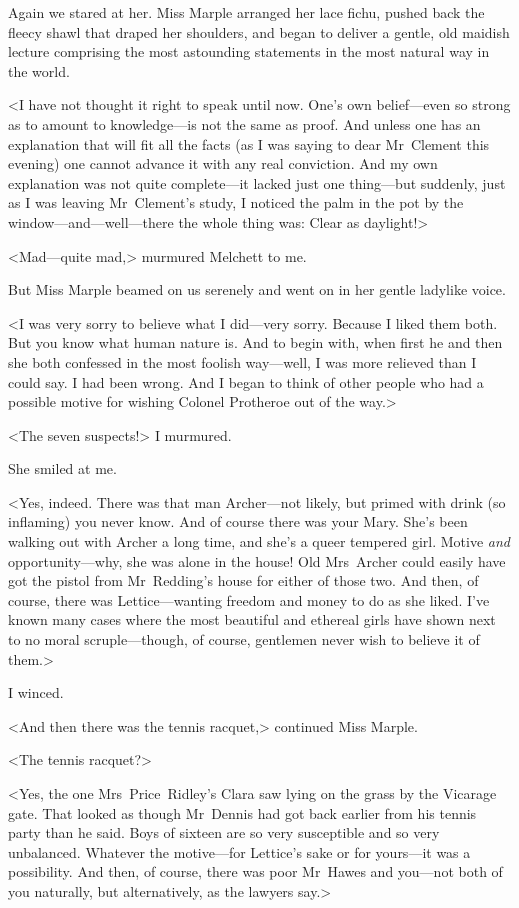 Again we stared at her. Miss Marple arranged her lace fichu, pushed back the fleecy shawl that draped her shoulders, and began to deliver a gentle, old maidish lecture comprising the most astounding statements in the most natural way in the world.

<I have not thought it right to speak until now. One's own belief—even so strong as to amount to knowledge—is not the same as proof. And unless one has an explanation that will fit all the facts (as I was saying to dear Mr~Clement this evening) one cannot advance it with any real conviction. And my own explanation was not quite complete—it lacked just one thing—but suddenly, just as I was leaving Mr~Clement's study, I noticed the palm in the pot by the window—and—well—there the whole thing was: Clear as daylight!>

<Mad—quite mad,> murmured Melchett to me.

But Miss Marple beamed on us serenely and went on in her gentle ladylike voice.

<I was very sorry to believe what I did—very sorry. Because I liked them both. But you know what human nature is. And to begin with, when first he and then she both confessed in the most foolish way—well, I was more relieved than I could say. I had been wrong. And I began to think of other people who had a possible motive for wishing Colonel Protheroe out of the way.>

<The seven suspects!> I murmured.

She smiled at me.

<Yes, indeed. There was that man Archer—not likely, but primed with drink (so inflaming) you never know. And of course there was your Mary. She's been walking out with Archer a long time, and she's a queer tempered girl. Motive \emph{and} opportunity—why, she was alone in the house! Old Mrs~Archer could easily have got the pistol from Mr~Redding's house for either of those two. And then, of course, there was Lettice—wanting freedom and money to do as she liked. I've known many cases where the most beautiful and ethereal girls have shown next to no moral scruple—though, of course, gentlemen never wish to believe it of them.>

I winced.

<And then there was the tennis racquet,> continued Miss Marple.

<The tennis racquet?>

<Yes, the one Mrs~Price~Ridley's Clara saw lying on the grass by the Vicarage gate. That looked as though Mr~Dennis had got back earlier from his tennis party than he said. Boys of sixteen are so very susceptible and so very unbalanced. Whatever the motive—for Lettice's sake or for yours—it was a possibility. And then, of course, there was poor Mr~Hawes and you—not both of you naturally, but alternatively, as the lawyers say.>

